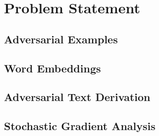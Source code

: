 \chapter{Problem Statement}
\section{Adversarial Examples}

\section{Word Embeddings}

\section{Adversarial Text Derivation}

\section{Stochastic Gradient Analysis}

